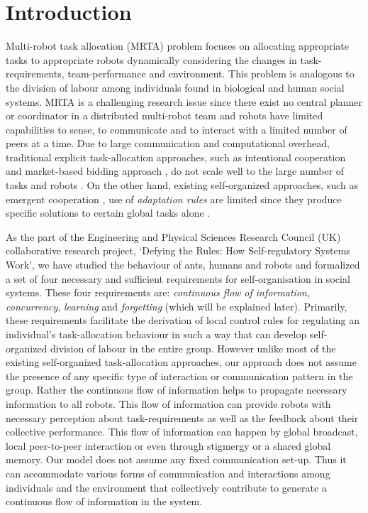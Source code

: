 \documentclass[smallcondensed]{svjour3}
\begin{document}
\section{Introduction}
\label{sec:intro}
Multi-robot task allocation (MRTA) problem focuses on allocating appropriate tasks to appropriate robots dynamically considering the changes in task-requirements, team-performance and environment. This problem is analogous to the division of labour among individuals found in biological and human social systems. MRTA is a challenging research issue since there exist no central planner or coordinator in a distributed multi-robot team and robots have limited capabilities to sense, to communicate and to interact with a limited number of peers at a time. Due to large communication and computational overhead, traditional explicit task-allocation approaches, such as intentional cooperation \citep{Parker2008} and market-based bidding approach \citep{Dias+2006},  do not scale well to the large number of tasks and robots \citep{Lerman+2006}. On the other hand, existing self-organized approaches, such as emergent cooperation \cite{Kube+1993}, use of {\em adaptation rules} \citep{Liu+2007} are limited since they produce specific solutions to certain global tasks alone \citep{Gerkey+2004}.

As the part of the Engineering and Physical Sciences Research Council (UK) collaborative  research project, `Defying the Rules: How Self-regulatory Systems Work', we have studied the behaviour of ants, humans and robots and formalized a set of four necessary and sufficient requirements for self-organisation in social systems. These four requirements are: \textit{continuous flow of information}, \textit{concurrency}, \textit{learning} and \textit{forgetting} (which will be explained later).  Primarily, these requirements facilitate the derivation of local control rules for regulating an individual's task-allocation behaviour in such a way that can develop self-organized division of labour in the entire group. However  unlike  most of the existing self-organized task-allocation approaches, our approach does not assume the presence of any specific type of interaction or communication pattern in the group. Rather the continuous flow of information helps to propagate necessary information to all robots. This flow of information can provide robots with necessary perception about task-requirements as well as the feedback about their collective performance. This flow of information can happen by global broadcast, local peer-to-peer interaction or even through stigmergy or a shared global memory. Our model does not assume any fixed communication set-up. Thus it can accommodate various forms of communication and interactions among individuals and the environment that collectively contribute to generate a continuous flow of information in the system.
\end{document}
